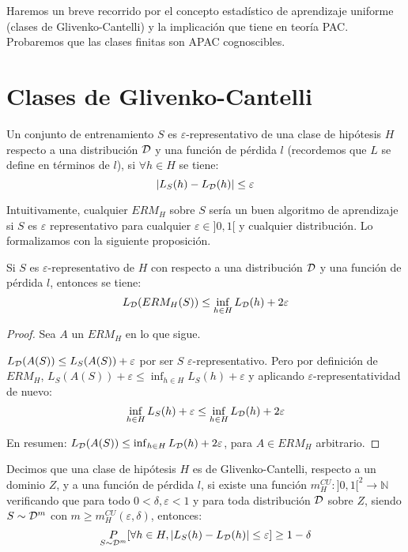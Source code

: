 Haremos un breve recorrido por el concepto estadístico de aprendizaje uniforme (clases de Glivenko-Cantelli) y la 
implicación que tiene en teoría PAC. Probaremos que las clases finitas son APAC cognoscibles.

\section{Clases de Glivenko-Cantelli}
\begin{definition}
 Un conjunto de entrenamiento $S$ es $\varepsilon$-representativo de una clase de hipótesis $H$ respecto a una
 distribución $\mathcal{D}$ y una función de pérdida $l$ (recordemos que $L$ se define en términos de $l$), 
 si $\forall h\in H$ se tiene:
 \[
   |L_S(h) - L_{\mathcal{D}}(h)| \le \varepsilon
 \]
\end{definition}

Intuitivamente, cualquier $ERM_H$ sobre $S$ sería un buen algoritmo de aprendizaje 
si $S$ es $\varepsilon$ representativo para cualquier $\varepsilon \in ]0,1[$ y cualquier distribución. 
Lo formalizamos con la siguiente proposición.

\begin{fact}
 Si $S$ es $\varepsilon$-representativo de $H$ con respecto a una distribución $\mathcal{D}$ y una función de 
 pérdida $l$, entonces se tiene:
 \[
   L_{\mathcal{D}}(ERM_H(S)) \le \inf_{h\in H} L_{\mathcal{D}}(h) + 2\varepsilon
 \]
 
 \label{fact:epsilon-rep}
\end{fact}

  \begin{proof}
   Sea $A$ un $ERM_H$ en lo que sigue.
   
   $L_{\mathcal{D}}(A(S)) \le L_S(A(S)) + \varepsilon$ por ser $S$ $\varepsilon$-representativo. Pero por definición de 
   $ERM_H$, $L_S(A(S)) + \varepsilon \le \inf_{h\in H}L_S(h) + \varepsilon$ y aplicando
   $\varepsilon$-representatividad de nuevo:
   \[
     \inf_{h\in H} L_S(h) + \varepsilon \le \inf_{h\in H} L_{\mathcal{D}}(h) + 2\varepsilon
   \]
   
   En resumen: $L_{\mathcal{D}}(A(S)) \le \inf_{h\in H} L_{\mathcal{D}}(h) + 2\varepsilon$, para $A \in ERM_H$ arbitrario.
  \end{proof}


\begin{definition}
Decimos que una clase de hipótesis $H$ es de Glivenko-Cantelli, respecto a un dominio $Z$, y a 
una función de pérdida $l$, si existe una función ${m_{H}^{CU}: ]0,1[^2 \rightarrow \mathbb{N}}$ 
verificando que para todo $0 < \delta, \varepsilon < 1$ y para toda distribución $\mathcal{D}$ sobre $Z$, 
siendo $S\sim \mathcal{D}^m$ con $m \ge m_{H}^{CU}(\varepsilon, \delta)$, entonces:
\[
  \underset{S\sim \mathcal{D}^m}{P} [\forall h\in H, |L_S(h) - L_{\mathcal{D}}(h)| \le \varepsilon] \ge 1-\delta
\]
\end{definition}

